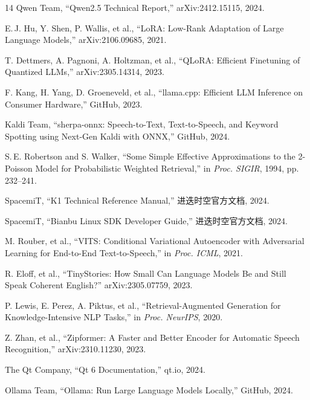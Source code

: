 \documentclass[lettersize,journal]{IEEEtran}
\begin{document}
\begin{thebibliography}{14}
Qwen Team, ``Qwen2.5 Technical Report,'' arXiv:2412.15115, 2024.

E.\,J. Hu, Y. Shen, P. Wallis, et al., ``LoRA: Low-Rank Adaptation of Large Language Models,'' arXiv:2106.09685, 2021.

T. Dettmers, A. Pagnoni, A. Holtzman, et al., ``QLoRA: Efficient Finetuning of Quantized LLMs,'' arXiv:2305.14314, 2023.

F. Kang, H. Yang, D. Groeneveld, et al., ``llama.cpp: Efficient LLM Inference on Consumer Hardware,'' GitHub, 2023.

Kaldi Team, ``sherpa-onnx: Speech-to-Text, Text-to-Speech, and Keyword Spotting using Next-Gen Kaldi with ONNX,'' GitHub, 2024.

S.\,E. Robertson and S. Walker, ``Some Simple Effective Approximations to the 2-Poisson Model for Probabilistic Weighted Retrieval,'' in \emph{Proc. SIGIR}, 1994, pp.\,232--241.

SpacemiT, ``K1 Technical Reference Manual,'' 进迭时空官方文档, 2024.

SpacemiT, ``Bianbu Linux SDK Developer Guide,'' 进迭时空官方文档, 2024.

M. Rouber, et al., ``VITS: Conditional Variational Autoencoder with Adversarial Learning for End-to-End Text-to-Speech,'' in \emph{Proc. ICML}, 2021.

R. Eloff, et al., ``TinyStories: How Small Can Language Models Be and Still Speak Coherent English?'' arXiv:2305.07759, 2023.

P. Lewis, E. Perez, A. Piktus, et al., ``Retrieval-Augmented Generation for Knowledge-Intensive NLP Tasks,'' in \emph{Proc. NeurIPS}, 2020.

Z. Zhan, et al., ``Zipformer: A Faster and Better Encoder for Automatic Speech Recognition,'' arXiv:2310.11230, 2023.

The Qt Company, ``Qt 6 Documentation,'' qt.io, 2024.

Ollama Team, ``Ollama: Run Large Language Models Locally,'' GitHub, 2024.
\end{thebibliography}
\end{document}
